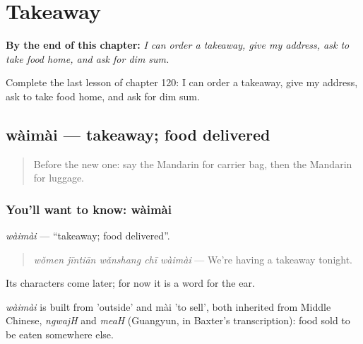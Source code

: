 
\chapter{Takeaway}
\label{ch:zh-takeaway}

\begin{chapteropening}
\textbf{By the end of this chapter:} \emph{I can order a takeaway, give my address, ask to take food home, and ask for dim sum.}

Complete the last lesson of chapter 120: I can order a takeaway, give my address, ask to take food home, and ask for dim sum.
\end{chapteropening}

\section[wàimài]{wàimài — takeaway; food delivered}

\label{lesson:ZH-C120-waimai}



\begin{quote}
Before the new one: say the Mandarin for carrier bag, then the Mandarin for luggage.
\end{quote}

\subsection*{You'll want to know: wàimài}
\emph{wàimài} — \textquotedblleft{}takeaway; food delivered\textquotedblright{}.

\begin{quote}
\emph{wǒmen jīntiān wǎnshang chī wàimài} — We're having a takeaway tonight.
\end{quote}

Its characters come later; for now it is a word for the ear.

\begin{cousinweb}
\emph{wàimài} is built from  'outside' and mài 'to sell', both inherited from Middle Chinese, \emph{ngwajH} and \emph{meaH} (Guangyun, in Baxter's transcription): food sold to be eaten somewhere else.
\end{cousinweb}

